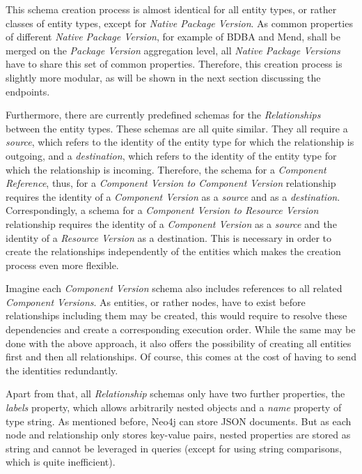 This schema creation process is almost identical for all entity types, or rather classes of entity types, except for \emph{Native Package Version}. As common properties of different \emph{Native Package Version}, for example of BDBA and Mend, shall be merged on the \emph{Package Version} aggregation level, all \emph{Native Package Versions} have to share this set of common properties. Therefore, this creation process is slightly more modular, as will be shown in the next section discussing the endpoints.\par
Furthermore, there are currently predefined schemas for the \emph{Relationships} between the entity types. These schemas are all quite similar. They all require a \emph{source}, which refers to the identity of the entity type for which the relationship is outgoing, and a \emph{destination}, which refers to the identity of the entity type for which the relationship is incoming. Therefore, the schema for a \emph{Component Reference}, thus, for a \emph{Component Version to Component Version} relationship requires the identity of a \emph{Component Version} as a \emph{source} and as a \emph{destination}. Correspondingly, a schema for a \emph{Component Version to Resource Version} relationship requires the identity of a \emph{Component Version} as a \emph{source} and the identity of a \emph{Resource Version} as a destination. This is necessary in order to create the relationships independently of the entities which makes the creation process even more flexible.\par 
Imagine each \emph{Component Version} schema also includes references to all related \emph{Component Versions}. As entities, or rather nodes, have to exist before relationships including them may be created, this would require to resolve these dependencies and create a corresponding execution order. While the same may be done with the above approach, it also offers the possibility of creating all entities first and then all relationships. Of course, this comes at the cost of having to send the identities redundantly.\par 
Apart from that, all \emph{Relationship} schemas only have two further properties, the \emph{labels} property, which allows arbitrarily nested objects and a \emph{name} property of type string. As mentioned before, Neo4j can store JSON documents. But as each node and relationship only stores key-value pairs, nested properties are stored as string and cannot be leveraged in queries (except for using string comparisons, which is quite inefficient).


